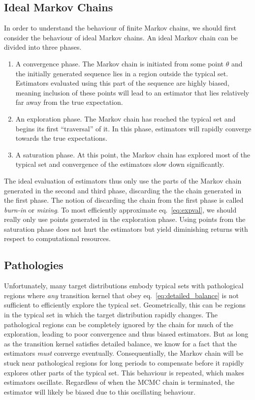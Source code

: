\subsection{Ideal Markov Chains}
In order to understand the behaviour of finite Markov chains, we should first 
consider the behaviour of ideal Markov chains.
An ideal Markov chain can be divided into three phases.
\begin{enumerate}
    \item A convergence phase. The Markov chain is initiated from some point $\theta$ and the initially generated sequence
    lies in a region outside the typical set. Estimators evaluated using this part of the sequence are highly biased,
    meaning inclusion of these points will lead to an estimator that lies relatively far away from the true expectation.
    \item An exploration phase. The Markov chain has reached the typical set and begins its first ``traversal'' of it.
    In this phase, estimators will rapidly converge towards the true expectations.
    \item A saturation phase. At this point, the Markov chain has explored most of the typical set and convergence
    of the estimators slow down significantly. 
\end{enumerate}
The ideal evaluation of estimators thus only use the parts of the Markov chain generated in the second and third phase, discarding the
the chain generated in the first phase. The notion of discarding the chain from the first phase is called \textit{burn-in} or \textit{mixing}.
To most efficiently approximate eq.~\eqref{eq:expval}, we should really only use points generated in the exploration phase.
Using points from the saturation phase does not hurt the estimators but yield diminishing returns
with respect to computational resources.

\subsection{Pathologies}
Unfortunately, many target distributions embody typical sets with pathological regions where \textit{any} 
transition kernel that obey eq.~\eqref{eq:detailed_balance} is not sufficient to efficiently explore the typical set.
Geometrically, this can be regions in the typical set in which the target distribution rapidly changes.
The pathological regions can be completely ignored by the chain for much of the exploration,
leading to poor convergence and thus biased estimators. But as long as the transition kernel
satisfies detailed balance, we know for a fact that the estimators \textit{must} converge eventually.
Consequentially, the Markov chain will be stuck near pathological regions for long periods to compensate
before it rapidly explores other parts of the typical set. This behaviour is repeated, 
which makes estimators oscillate. Regardless of when the MCMC chain is terminated, the estimator will likely be biased due
to this oscillating behaviour.

